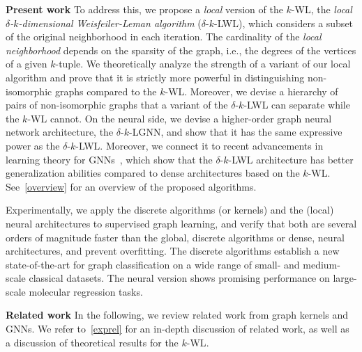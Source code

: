 \documentclass{article}
\newcommand{\xhdr}[1]{{\noindent\bfseries #1}}
\theoremstyle{definition}
\newcommand{\new}[1]{\emph{#1}}
\newcommand{\kwl}{$k$-\textsf{WL}\xspace}
\newcommand{\localkwl}{$\delta$-$k$-\textsf{LWL}\xspace}
\newcommand{\localkwln}{$\delta$-$k$-\textsf{LGNN}\xspace}
\begin{document}
\xhdr{Present work} To address this, we propose a \new{local} version of the \kwl, the \new{local $\delta$-$k$-dimensional Weisfeiler-Leman algorithm} (\localkwl), which considers a subset of the original neighborhood in each iteration. The cardinality of the \new{local neighborhood} depends on the sparsity of the graph, i.e., the degrees of the vertices of a given $k$-tuple. We theoretically analyze the strength of a variant of our local algorithm and prove that it is strictly more powerful in distinguishing non-isomorphic graphs compared to the \kwl. Moreover, we devise a hierarchy of pairs of non-isomorphic graphs that a variant of the \localkwl can separate while the \kwl cannot. On the neural side, we devise a higher-order graph neural network architecture, the \localkwln, and show that it has the same expressive power as the \localkwl. Moreover, we connect it to recent advancements in learning theory for GNNs~\cite{Gar+2020}, which show that the \localkwl architecture has better generalization abilities compared to dense architectures based on the \kwl. See~\cref{overview} for an overview of the proposed algorithms.

Experimentally, we apply the discrete algorithms (or kernels) and the (local) neural architectures to supervised graph learning, and verify that both are several orders of magnitude faster than the global, discrete algorithms or dense, neural architectures, and prevent overfitting. The discrete algorithms establish a new state-of-the-art for graph classification on a wide range of small- and medium-scale classical datasets. The neural version shows promising performance on large-scale molecular regression tasks.

\xhdr{Related work}
In the following, we review related work from graph kernels and GNNs. We refer to~\cref{exprel} for an in-depth discussion of related work, as well as a discussion of theoretical results for the \kwl.
\end{document}
